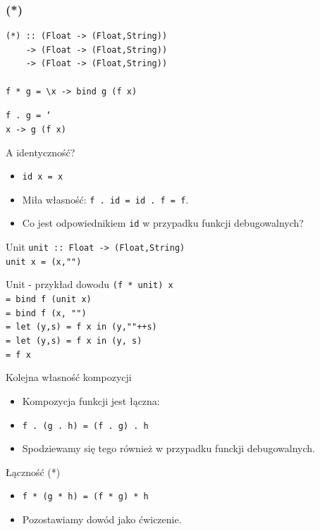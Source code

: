 \documentclass[14pt]{beamer}
\begin{document}
\begin{frame}[fragile]
\frametitle{(*)}
\begin{verbatim}
(*) :: (Float -> (Float,String))
    -> (Float -> (Float,String))
    -> (Float -> (Float,String))

f * g = \x -> bind g (f x)
\end{verbatim}
\pause

\texttt{f . g = \char`\\x -> g (f x)}
\end{frame}

\begin{frame}{A identyczność?}
    \begin{itemize}
        \item \texttt{id x = x}
        \item Miła własność: \texttt{f . id = id . f = f}.
        \item Co jest odpowiednikiem \texttt{id} w przypadku
            funkcji debugowalnych?
    \end{itemize}
\end{frame}

\begin{frame}{Unit}
    \texttt{unit :: Float -> (Float,String)\\
    unit x = (x,"")}
\end{frame}

\begin{frame}{Unit - przykład dowodu}
    \texttt{(f * unit) x\\
        = bind f (unit x)\\
        = bind f (x, "")\\
        = let (y,s) = f x in (y,""++s)\\
        = let (y,s) = f x in (y, s)\\
        = f x
    }
\end{frame}

\begin{frame}{Kolejna własność kompozycji}
    \begin{itemize}
        \item Kompozycja funkcji jest łączna:
        \item \texttt{f . (g . h) = (f . g) . h}
        \item Spodziewamy się tego również w przypadku funckji debugowalnych.
    \end{itemize}
\end{frame}

\begin{frame}{Łączność (*)}
    \begin{itemize}
        \item \texttt{f * (g * h) = (f * g) * h}
        \pause
        \item Pozostawiamy dowód jako ćwiczenie.
    \end{itemize}
\end{frame}
\end{document}
